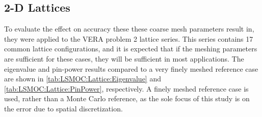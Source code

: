 {{{{        %
      }
    }

    \subsection{2-D Lattices}{\label{ssec:LSMOC:2-D Lattices}
      To evaluate the effect on accuracy these these coarse mesh parameters result in, they were applied to the \ac{VERA} problem 2 lattice series.
      This series contains 17 common lattice configurations, and it is expected that if the meshing parameters are sufficient for these cases, they will be sufficient in most applications.
      The eigenvalue and pin-power results compared to a very finely meshed reference case are shown in \cref{tab:LSMOC:Lattice:Eigenvalue} and \cref{tab:LSMOC:Lattice:PinPower}, respectively.
      A finely meshed reference case is used, rather than a Monte Carlo reference, as the sole focus of this study is on the error due to spatial discretization.

}}}
